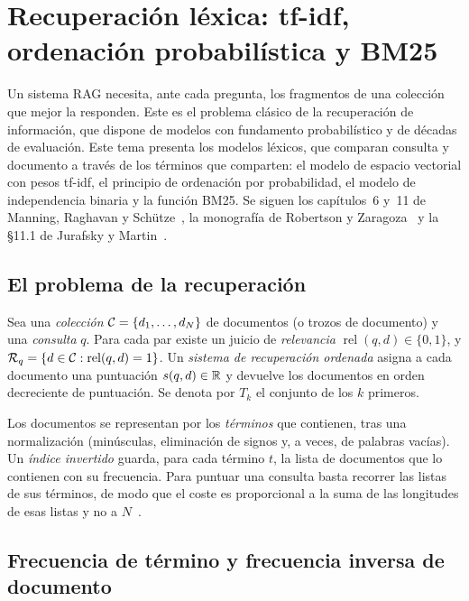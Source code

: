 \chapter{Recuperación léxica: tf-idf, ordenación probabilística y BM25}
\label{tema:2}

Un sistema RAG necesita, ante cada pregunta, los fragmentos de una colección que mejor la responden. Este es el problema clásico de la recuperación de información, que dispone de modelos con fundamento probabilístico y de décadas de evaluación. Este tema presenta los modelos léxicos, que comparan consulta y documento a través de los términos que comparten: el modelo de espacio vectorial con pesos tf-idf, el principio de ordenación por probabilidad, el modelo de independencia binaria y la función BM25. Se siguen los capítulos~6 y~11 de Manning, Raghavan y Schütze~\cite{iir}, la monografía de Robertson y Zaragoza~\cite{rz} y la §11.1 de Jurafsky y Martin~\cite{jm3}.

\section{El problema de la recuperación}

\begin{definicion}\label{def:recuperacion}
Sea una \emph{colección} $\mathcal{C}=\{d_1,\dots,d_N\}$ de documentos (o trozos de documento) y una \emph{consulta} $q$. Para cada par existe un juicio de \emph{relevancia} $\operatorname{rel}(q,d)\in\{0,1\}$, y $\mathcal{R}_q=\{d\in\mathcal{C}:\operatorname{rel}(q,d)=1\}$. Un \emph{sistema de recuperación ordenada} asigna a cada documento una puntuación $s(q,d)\in\mathbb{R}$ y devuelve los documentos en orden decreciente de puntuación. Se denota por $T_k$ el conjunto de los $k$ primeros.
\end{definicion}

Los documentos se representan por los \emph{términos} que contienen, tras una normalización (minúsculas, eliminación de signos y, a veces, de palabras vacías). Un \emph{índice invertido} guarda, para cada término $t$, la lista de documentos que lo contienen con su frecuencia. Para puntuar una consulta basta recorrer las listas de sus términos, de modo que el coste es proporcional a la suma de las longitudes de esas listas y no a $N$~\cite[§11.1.4]{jm3}.

\section{Frecuencia de término y frecuencia inversa de documento}

